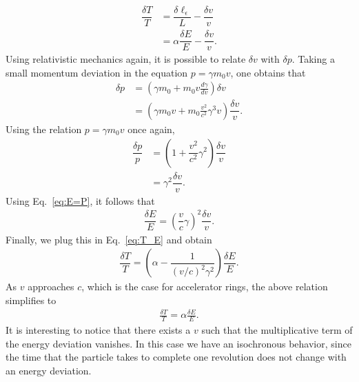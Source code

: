 \begin{align}\label{eq:T_E}
	\dfrac{\delta T}{T} &= \dfrac{\delta \ell_\epsilon}{L} - \dfrac{\delta v}{v}\\
    					&= \alpha \dfrac{\delta E}{E} - \dfrac{\delta v}{v}.
\end{align}
Using relativistic mechanics again, it is possible to relate $\delta v$ with $\delta p$. Taking a small momentum deviation in the equation $p = \gamma m_0 v$, one obtains that
\begin{align*}
	\delta p &= \left(\gamma m_0 + m_0 v \frac{d\gamma}{dv}\right)\delta v\\
    		&= \left(\gamma m_0 v + m_0 \frac{v^2}{c^2} \gamma^3 v \right) \dfrac{\delta v}{v}.
\end{align*}
Using the relation $p = \gamma m_0 v$ once again,
\begin{align*}
	\dfrac{\delta p}{p} &= \left( 1 + \dfrac{v^2}{c^2}\gamma^2 \right) \dfrac{\delta v}{v}\\
    					&= \gamma^2 \dfrac{\delta v}{v}.
\end{align*}
Using Eq.~\eqref{eq:E=P}, it follows that
\begin{align}
	\dfrac{\delta E}{E} = \left( \dfrac{v}{c}\gamma \right)^2 \dfrac{\delta v}{v}.
\end{align}
Finally, we plug this in Eq.~\eqref{eq:T_E} and obtain
\begin{align}
	\dfrac{\delta T}{T} = \left( \alpha - \dfrac{1}{(v/c)^2\gamma^2} \right)\dfrac{\delta E}{E}.
\end{align}
As $v$ approaches $c$, which is the case for accelerator rings, the above relation simplifies to
\begin{align} \label{eq:3.15}
\frac{\delta T}{T} = \alpha \frac{\delta E}{E}.
\end{align}
It is interesting to notice that there exists a $v$ such that the multiplicative term of the energy deviation vanishes. In this case we have an isochronous behavior, since the time that the particle takes to complete one revolution does not change with an energy deviation.
